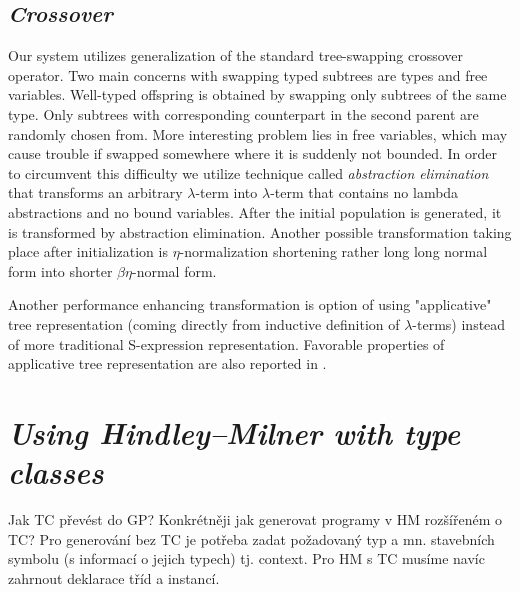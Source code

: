 \documentclass[11pt]{article}
\newcommand{\lterm}{$\lambda$-term\xspace}
\newcommand{\lterms}{$\lambda$-terms\xspace}
\newcommand{\HM}{Hindley–Milner\xspace}
\newcommand{\red}[1]{{\color{red} #1}}
\begin{document}
\begin{article}
\subsection{\textit{Crossover}}

Our system utilizes generalization of the standard tree-swapping crossover operator. Two main concerns with swapping typed subtrees are types and free variables. Well-typed offspring is obtained by swapping only subtrees of the same type. Only subtrees with corresponding counterpart in the second parent are randomly chosen from. More interesting problem lies in free variables, which may cause trouble if swapped somewhere where it is suddenly not bounded. In order to circumvent this difficulty we utilize technique called \textit{abstraction elimination}\citep{jones87} that transforms an arbitrary \lterm into \lterm that contains no lambda abstractions and no bound variables. After the initial population is generated,  it is transformed by abstraction elimination. Another possible transformation taking place after initialization is $\eta$-normalization shortening rather long long normal form into shorter $\beta\eta$-normal form.  

Another performance enhancing transformation is option of using "applicative" tree representation (coming directly from inductive definition of \lterms) instead of more traditional S-expression representation. Favorable properties of applicative tree representation are also reported in \citep{yu1998polygp}. 

\section{\textit{Using \HM with type classes}}







Jak TC převést do GP? Konkrétněji jak generovat programy v HM rozšířeném o TC?
Pro generování bez TC je potřeba zadat požadovaný typ a mn. stavebních symbolu (s informací o jejich typech) tj. context. Pro HM s TC musíme navíc zahrnout deklarace tříd a instancí.


\end{article}
\end{document}
